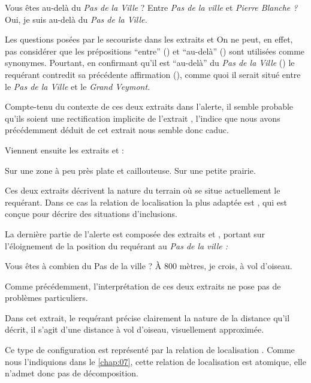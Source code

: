 \begin{dialogue}
  \Sec {} Vous êtes au-delà du \emph{Pas de la Ville} ?
   Entre \emph{Pas de la ville} et \emph{Pierre Blanche ?}
  \Req {} Oui, je suis au-delà du \emph{Pas de la Ville.}
\end{dialogue}
%
Les questions posées par le secouriste dans les extraits  et
%
On ne peut, en effet, pas considérer que les prépositions
\enquote{entre} () et \enquote{au-delà} () sont
utilisées comme synonymes.
%
Pourtant, en confirmant qu'il est \enquote{au-delà} du \emph{Pas de la
  Ville} () le requérant contredit sa précédente affirmation
(), comme quoi il serait situé entre le \emph{Pas de la
  Ville} et le \emph{Grand Veymont.}

Compte-tenu du contexte de ces deux extraits dans l'alerte, il semble
probable qu'ils soient une rectification implicite de l'extrait
, l'indice que nous avons précédemment déduit de cet extrait
nous semble donc caduc.

Viennent ensuite les extraits  et  :
%
\begin{dialogue}
  \Req {} Sur une zone à peu près plate et
  caillouteuse.  Sur une petite prairie.
\end{dialogue}
%
Ces deux extraits décrivent la nature du terrain où se situe
actuellement le requérant. Dans ce cas la relation de localisation la
plus adaptée est , qui est conçue pour
décrire des situations d'inclusions.


La dernière partie de l'alerte est composée des extraits  et
, portant sur l'éloignement de la position du requérant au
\emph{Pas de la ville :}
%
\begin{dialogue}
  \Sec {} Vous êtes à combien du Pas de la ville ?
  \Req {} À 800 mètres, je crois, à vol d'oiseau.
\end{dialogue}
%
Comme précédemment, l'interprétation de ces deux extraits ne pose pas
de problèmes particuliers.


Dans cet extrait, le requérant précise clairement la nature de la
distance qu'il décrit, il s'agit d'une distance à vol d'oiseau,
visuellement approximée.

Ce type de configuration est représenté par la relation de
localisation
. Comme nous
l'indiquions dans le \autoref{chap:07}, cette relation de localisation
est atomique, elle n'admet donc pas de décomposition.

